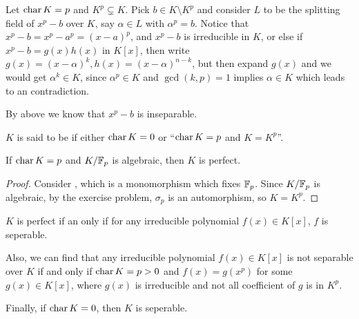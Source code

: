 \begin{example}
  Let $\operatorname{char} K = p$ and $K^p \subsetneq K$. Pick $b \in K \setminus K^p$ and consider $L$ to be
  the splitting field of $x^p - b$ over $K$, say $\alpha \in L$ with $\alpha^p = b$.
  Notice that $x^p - b = x^p - a^p = (x - a)^p$, and $x^p - b$ is irreducible in $K$, or else
  if $x^p - b = g(x) h(x)$ in $K[x]$, then write $g(x) = (x - \alpha)^k, h(x) = (x - \alpha)^{n-k}$,
  but then expand $g(x)$ and we would get $\alpha^k \in K$, since $\alpha^p \in K$ and
  $\gcd(k, p) = 1$ implies $\alpha \in K$ which leads to an contradiction.

  By above we know that $x^p - b$ is inseparable.
\end{example}

\begin{definition}
  $K$ is said to be \emph{} if either $\operatorname{char} K = 0$ or ``$\operatorname{char} K = p$ and $K = K^p$''.
\end{definition}

\begin{example}
  If $\operatorname{char} K = p$ and ${K}/{\mathbb{F}_p}$ is algebraic, then $K$ is perfect.

  \begin{proof}
    Consider , which is a monomorphism which fixes $\mathbb{F}_p$.
    Since ${K}/{\mathbb{F}_p}$ is algebraic, by the exercise problem, $\sigma_p$ is an automorphism, so $K = K^p$.
  \end{proof}
\end{example}

\begin{fact}
  $K$ is perfect if an only if for any irreducible polynomial $f(x) \in K[x]$, $f$ is seperable.

  Also, we can find that any irreducible polynomial $f(x) \in K[x]$ is not separable over $K$
  if and only if $\operatorname{char} K = p > 0$ and $f(x) = g(x^p)$ for some $g(x) \in K[x]$, where
  $g(x)$ is irreducible and not all coefficient of $g$ is in $K^p$.

  Finally, if $\operatorname{char} K = 0$, then $K$ is seperable.
\end{fact}

